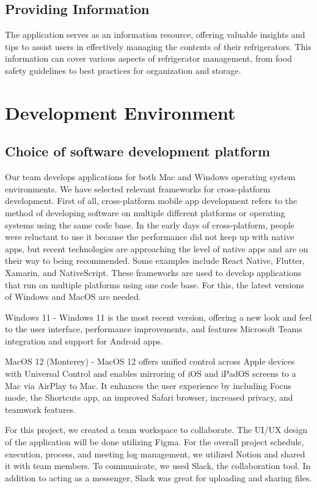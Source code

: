 \documentclass[conference]{IEEEtran}
\begin{document}
\subsection{Providing Information}
The application serves as an information resource, offering valuable insights and tips to assist users in effectively managing the contents of their refrigerators. This information can cover various aspects of refrigerator management, from food safety guidelines to best practices for organization and storage.

\section{Development Environment}
\subsection{Choice of software development platform}
Our team develops applications for both Mac and Windows operating system environments. We have selected relevant frameworks for cross-platform development. First of all, cross-platform mobile app development refers to the method of developing software on multiple different platforms or operating systems using the same code base. In the early days of cross-platform, people were reluctant to use it because the performance did not keep up with native apps, but recent technologies are approaching the level of native apps and are on their way to being recommended.  Some examples include React Native, Flutter, Xamarin, and NativeScript. These frameworks are used to develop applications that run on multiple platforms using one code base.  For this, the latest versions of Windows and MacOS are needed.  \par
Windows 11  - Windows 11 is the most recent version, offering a new look and feel to the user interface, performance improvements, and features Microsoft Teams integration and support for Android apps. \par
MacOS 12 (Monterey)  - MacOS 12 offers unified control across Apple devices with Universal Control and enables mirroring of iOS and iPadOS screens to a Mac via AirPlay to Mac. It enhances the user experience by including Focus mode, the Shortcuts app, an improved Safari browser, increased privacy, and teamwork features.

For this project, we created a team workspace to collaborate. The UI/UX design of the application will be done utilizing Figma. For the overall project schedule, execution, process, and meeting log management, we utilized Notion and shared it with team members. To communicate, we used Slack, the collaboration tool. In addition to acting as a messenger, Slack was great for uploading and sharing files.
\end{document}
